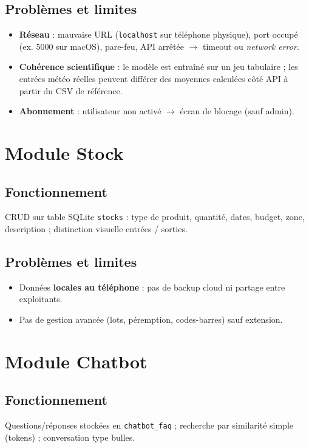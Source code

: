 \documentclass[12pt,a4paper,twoside,openright]{report}
\begin{document}
\subsection{Problèmes et limites}
\begin{itemize}
  \item \textbf{Réseau} : mauvaise URL (\texttt{localhost} sur téléphone physique), port occupé (ex. 5000 sur macOS), pare-feu, API arrêtée $\rightarrow$ timeout ou \textit{network error}.
  \item \textbf{Cohérence scientifique} : le modèle est entraîné sur un jeu tabulaire ; les entrées météo réelles peuvent différer des moyennes calculées côté API à partir du CSV de référence.
  \item \textbf{Abonnement} : utilisateur non activé $\rightarrow$ écran de blocage (sauf admin).
\end{itemize}

\section{Module Stock}

\subsection{Fonctionnement}
CRUD sur table SQLite \texttt{stocks} : type de produit, quantité, dates, budget, zone, description ; distinction visuelle entrées / sorties.

\subsection{Problèmes et limites}
\begin{itemize}
  \item Données \textbf{locales au téléphone} : pas de backup cloud ni partage entre exploitants.
  \item Pas de gestion avancée (lots, péremption, codes-barres) sauf extension.
\end{itemize}

\section{Module Chatbot}

\subsection{Fonctionnement}
Questions/réponses stockées en \texttt{chatbot\_faq} ; recherche par similarité simple (tokens) ; conversation type bulles.
\end{document}
